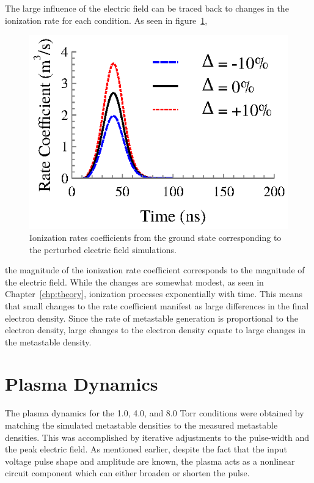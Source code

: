 The large influence of the electric field can be traced back to changes in the
ionization rate for each condition. As seen in figure~\ref{fig:ionrates},
\begin{figure}
  \centering
  \includegraphics{./chapters/modeling/figures/ionrates.eps}
  \caption{Ionization rates coefficients from the ground state corresponding to
    the perturbed electric field simulations.}
  \label{fig:ionrates}
\end{figure}
the magnitude of the ionization rate coefficient corresponds to the magnitude of
the electric field. While the changes are somewhat modest, as seen in
Chapter~\ref{chp:theory}, ionization processes exponentially with time. This
means that small changes to the rate coefficient manifest as large differences
in the final electron density. Since the rate of metastable generation is
proportional to the electron density, large changes to the electron density
equate to large changes in the metastable density.

\section{Plasma Dynamics}

The plasma dynamics for the 1.0, 4.0, and 8.0 Torr conditions were obtained by
matching the simulated metastable densities to the measured metastable
densities. This was accomplished by iterative adjustments to the pulse-width and
the peak electric field. As mentioned earlier, despite the fact that the input
voltage pulse shape and amplitude are known, the plasma acts as a nonlinear
circuit component which can either broaden or shorten the pulse.


